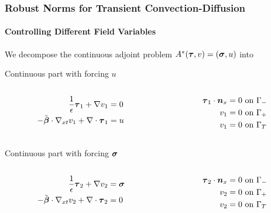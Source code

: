 \documentclass[18pt,xcolor=table]{beamer}
\begin{document}
\begin{frame}[t]
\frametitle{Robust Norms for Transient Convection-Diffusion}
\framesubtitle{Controlling Different Field Variables}
We decompose the continuous adjoint problem
$
A^*(\boldsymbol\tau,v)=(\boldsymbol\sigma,u)
$
into
\begin{block}{Continuous part with forcing $u$}
\begin{columns}[t]
\begin{column}{0.4\textwidth}
\begin{align*}
\frac{1}{\epsilon}\boldsymbol\tau_1+\nabla v_1 &=0\\
-\tilde{\boldsymbol\beta}\cdot\nabla_{xt} v_1 + \nabla\cdot\boldsymbol\tau_1 &= u\\
\end{align*}
\end{column}
\begin{column}{0.4\textwidth}
\begin{align*}
\boldsymbol\tau_1\cdot\boldsymbol n_x &= 0 \text{ on } \Gamma_-\\
v_1 &= 0 \text{ on } \Gamma_+\\
v_1 &= 0 \text{ on } \Gamma_T
\end{align*}
\end{column}
\end{columns}
\end{block}
\begin{block}{Continuous part with forcing $\boldsymbol\sigma$}
\begin{columns}[t]
\begin{column}{0.4\textwidth}
\begin{align*}
\frac{1}{\epsilon}\boldsymbol\tau_2+\nabla v_2 &=\boldsymbol\sigma\\
-\tilde{\boldsymbol\beta}\cdot\nabla_{xt} v_2 + \nabla\cdot\boldsymbol\tau_2 &= 0\\
\end{align*}
\end{column}
\begin{column}{0.4\textwidth}
\begin{align*}
\boldsymbol\tau_2\cdot\boldsymbol n_x &= 0 \text{ on } \Gamma_-\\
v_2 &= 0 \text{ on } \Gamma_+\\
v_2 &= 0 \text{ on } \Gamma_T
\end{align*}
\end{column}
\end{columns}
\end{block}
\end{frame}
\end{document}
